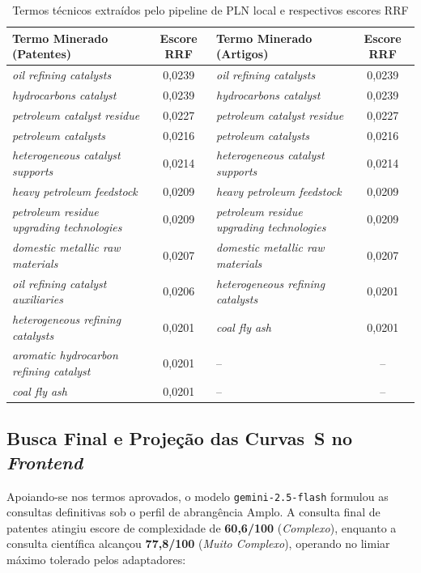 \documentclass[12pt, a4paper]{article}
\begin{document}
\begin{table}[H]
\centering
\caption{Termos técnicos extraídos pelo pipeline de PLN local e respectivos escores RRF}
\label{tab:apb-termos}
\small
\begin{tabular}{lc|lc}
\toprule
\textbf{Termo Minerado (Patentes)} & \textbf{Escore RRF} & \textbf{Termo Minerado (Artigos)} & \textbf{Escore RRF} \\
\midrule
\textit{oil refining catalysts} & 0,0239 & \textit{oil refining catalysts} & 0,0239 \\
\textit{hydrocarbons catalyst} & 0,0239 & \textit{hydrocarbons catalyst} & 0,0239 \\
\textit{petroleum catalyst residue} & 0,0227 & \textit{petroleum catalyst residue} & 0,0227 \\
\textit{petroleum catalysts} & 0,0216 & \textit{petroleum catalysts} & 0,0216 \\
\textit{heterogeneous catalyst supports} & 0,0214 & \textit{heterogeneous catalyst supports} & 0,0214 \\
\textit{heavy petroleum feedstock} & 0,0209 & \textit{heavy petroleum feedstock} & 0,0209 \\
\textit{petroleum residue upgrading technologies} & 0,0209 & \textit{petroleum residue upgrading technologies} & 0,0209 \\
\textit{domestic metallic raw materials} & 0,0207 & \textit{domestic metallic raw materials} & 0,0207 \\
\textit{oil refining catalyst auxiliaries} & 0,0206 & \textit{heterogeneous refining catalysts} & 0,0201 \\
\textit{heterogeneous refining catalysts} & 0,0201 & \textit{coal fly ash} & 0,0201 \\
\textit{aromatic hydrocarbon refining catalyst} & 0,0201 & -- & -- \\
\textit{coal fly ash} & 0,0201 & -- & -- \\
\bottomrule
\end{tabular}
\end{table}

  \subsection{Busca Final e Projeção das Curvas~S no \textit{Frontend}}

  Apoiando-se nos termos aprovados, o modelo \texttt{gemini-2.5-flash} formulou as consultas definitivas sob o perfil de abrangência Amplo. A consulta final de patentes atingiu escore de complexidade de \textbf{60,6/100} (\textit{Complexo}), enquanto a consulta científica alcançou \textbf{77,8/100} (\textit{Muito Complexo}), operando no limiar máximo tolerado pelos adaptadores:
\end{document}
